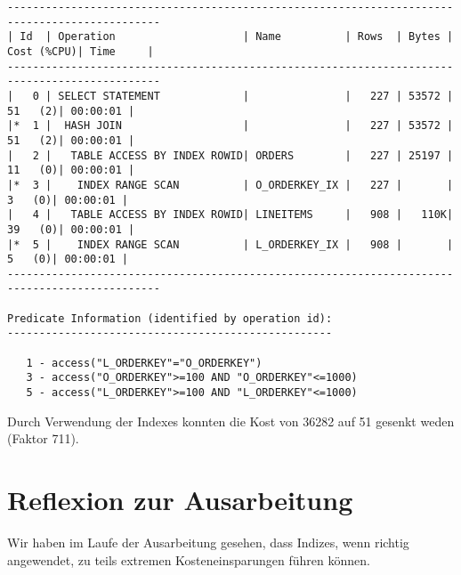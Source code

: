 \documentclass[10pt]{article}
\begin{document}
\begin{lstlisting}[style=queryexecutionplan]
----------------------------------------------------------------------------------------------
| Id  | Operation                    | Name          | Rows  | Bytes | Cost (%CPU)| Time     |
----------------------------------------------------------------------------------------------
|   0 | SELECT STATEMENT             |               |   227 | 53572 |    51   (2)| 00:00:01 |
|*  1 |  HASH JOIN                   |               |   227 | 53572 |    51   (2)| 00:00:01 |
|   2 |   TABLE ACCESS BY INDEX ROWID| ORDERS        |   227 | 25197 |    11   (0)| 00:00:01 |
|*  3 |    INDEX RANGE SCAN          | O_ORDERKEY_IX |   227 |       |     3   (0)| 00:00:01 |
|   4 |   TABLE ACCESS BY INDEX ROWID| LINEITEMS     |   908 |   110K|    39   (0)| 00:00:01 |
|*  5 |    INDEX RANGE SCAN          | L_ORDERKEY_IX |   908 |       |     5   (0)| 00:00:01 |
----------------------------------------------------------------------------------------------
 
Predicate Information (identified by operation id):
---------------------------------------------------
 
   1 - access("L_ORDERKEY"="O_ORDERKEY")
   3 - access("O_ORDERKEY">=100 AND "O_ORDERKEY"<=1000)
   5 - access("L_ORDERKEY">=100 AND "L_ORDERKEY"<=1000)
\end{lstlisting}

Durch Verwendung der Indexes konnten die Kost von 36282 auf 51 gesenkt weden (Faktor 711).

\section{Reflexion zur Ausarbeitung}
Wir haben im Laufe der Ausarbeitung gesehen, dass Indizes, wenn richtig angewendet, zu teils extremen Kosteneinsparungen führen können.

\end{document}
